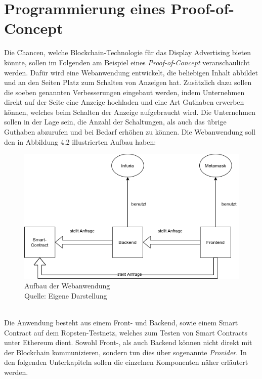\section{Programmierung eines Proof-of-Concept}
Die Chancen, welche Blockchain-Technologie für das Display Advertising bieten könnte, sollen im Folgenden am Beispiel eines \emph{Proof-of-Concept} veranschaulicht werden. 
Dafür wird eine Webanwendung entwickelt, die beliebigen Inhalt abbildet und an den Seiten Platz zum Schalten von Anzeigen hat. 
Zusätzlich dazu sollen die soeben genannten Verbesserungen eingebaut werden, indem Unternehmen direkt auf der Seite eine Anzeige hochladen und eine Art Guthaben erwerben können, welches beim Schalten der Anzeige aufgebraucht wird. Die Unternehmen sollen in der Lage sein, die Anzahl der Schaltungen, als auch das übrige Guthaben abzurufen und bei Bedarf erhöhen zu können. Die Webanwendung soll den in Abbildung 4.2 illustrierten Aufbau haben:
\begin{figure}[htpb]
	\centering
	\includegraphics[width=\textwidth]{images/aufbau_PoC.png}
	\caption{Aufbau der Webanwendung\\
	Quelle: Eigene Darstellung}
	\label{6braun:fig:aufbau_poc}
\end{figure}\\
Die Anwendung besteht aus einem Front- und Backend, sowie einem Smart Contract auf dem Ropsten-Testnetz, welches zum Testen von Smart Contracts unter Ethereum dient. Sowohl Front-, als auch Backend können nicht direkt mit der Blockchain kommunizieren, sondern tun dies über sogenannte \emph{Provider}. In den folgenden Unterkapiteln sollen die einzelnen Komponenten näher erläutert werden.
